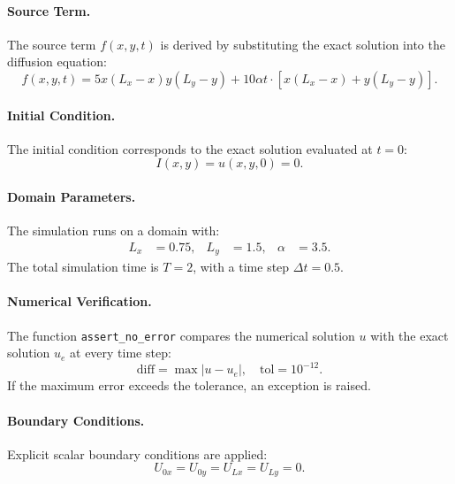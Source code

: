 \documentclass{article}
\begin{document}
		\paragraph{Source Term.}
		The source term \( f(x, y, t) \) is derived by substituting the exact solution into the diffusion equation:
		\[
		f(x, y, t) = 5x(L_x - x)y(L_y - y) + 10\alpha t \cdot \left[ x(L_x - x) + y(L_y - y) \right].
		\]
		
		\paragraph{Initial Condition.}
		The initial condition corresponds to the exact solution evaluated at \( t = 0 \):
		\[
		I(x, y) = u(x, y, 0) = 0.
		\]
		
		\paragraph{Domain Parameters.}
		The simulation runs on a domain with:
		\begin{align*}
			L_x &= 0.75, & L_y &= 1.5, & \alpha &= 3.5.
		\end{align*}
		The total simulation time is \( T = 2 \), with a time step \( \Delta t = 0.5 \).
		
		\paragraph{Numerical Verification.}
		The function \texttt{assert\_no\_error} compares the numerical solution \( u \) with the exact solution \( u_e \) at every time step:
		\[
		\text{diff} = \max |u - u_e|, \quad \text{tol} = 10^{-12}.
		\]
		If the maximum error exceeds the tolerance, an exception is raised.
		
		\paragraph{Boundary Conditions.}
		Explicit scalar boundary conditions are applied:
		\[
		U_{0x} = U_{0y} = U_{Lx} = U_{Ly} = 0.
		\]
		

		
\end{document}
